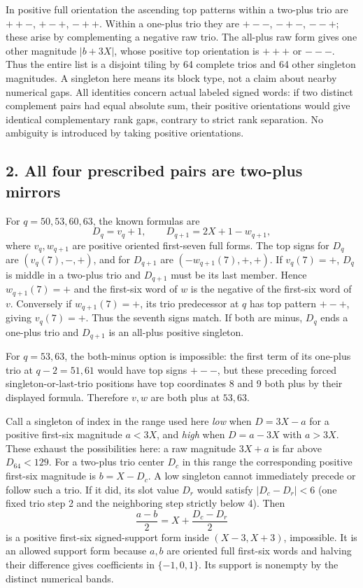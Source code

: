 \documentclass[
  11pt,
]{article}
\begin{document}
In positive full orientation the ascending top patterns within a
two-plus trio are \(++-\), \(+-+\), \(-++\). Within a one-plus trio they
are \(+--\), \(-+-\), \(--+\); these arise by complementing a negative
raw trio. The all-plus raw form gives one other magnitude \(|b+3X|\),
whose positive top orientation is \(+++\) or \(---\). Thus the entire
list is a disjoint tiling by 64 complete trios and 64 other singleton
magnitudes. A singleton here means its block type, not a claim about
nearby numerical gaps. All identities concern actual labeled signed
words: if two distinct complement pairs had equal absolute sum, their
positive orientations would give identical complementary rank gaps,
contrary to strict rank separation. No ambiguity is introduced by taking
positive orientations.

\subsection{2. All four prescribed pairs are two-plus
mirrors}\label{all-four-prescribed-pairs-are-two-plus-mirrors}

For \(q=50,53,60,63\), the known formulas are \[
D_q=v_q+1,\qquad D_{q+1}=2X+1-w_{q+1},
\] where \(v_q,w_{q+1}\) are positive oriented first-seven full forms.
The top signs for \(D_q\) are \((v_q(7),-,+)\), and for \(D_{q+1}\) are
\((-w_{q+1}(7),+,+)\). If \(v_q(7)=+\), \(D_q\) is middle in a two-plus
trio and \(D_{q+1}\) must be its last member. Hence \(w_{q+1}(7)=+\) and
the first-six word of \(w\) is the negative of the first-six word of
\(v\). Conversely if \(w_{q+1}(7)=+\), its trio predecessor at \(q\) has
top pattern \(+-+\), giving \(v_q(7)=+\). Thus the seventh signs match.
If both are minus, \(D_q\) ends a one-plus trio and \(D_{q+1}\) is an
all-plus positive singleton.

For \(q=53,63\), the both-minus option is impossible: the first term of
its one-plus trio at \(q-2=51,61\) would have top signs \(+--\), but
these preceding forced singleton-or-last-trio positions have top
coordinates 8 and 9 both plus by their displayed formula. Therefore
\(v,w\) are both plus at \(53,63\).

Call a singleton of index in the range used here \emph{low} when
\(D=3X-a\) for a positive first-six magnitude \(a<3X\), and \emph{high}
when \(D=a-3X\) with \(a>3X\). These exhaust the possibilities here: a
raw magnitude \(3X+a\) is far above \(D_{64}<129\). For a two-plus trio
center \(D_c\) in this range the corresponding positive first-six
magnitude is \(b=X-D_c\). A low singleton cannot immediately precede or
follow such a trio. If it did, its slot value \(D_r\) would satisfy
\(|D_c-D_r|<6\) (one fixed trio step 2 and the neighboring step strictly
below 4). Then \[
\frac{a-b}{2}=X+\frac{D_c-D_r}{2}
\] is a positive first-six signed-support form inside \((X-3,X+3)\),
impossible. It is an allowed support form because \(a,b\) are oriented
full first-six words and halving their difference gives coefficients in
\(\{-1,0,1\}\). Its support is nonempty by the distinct numerical bands.
\end{document}
